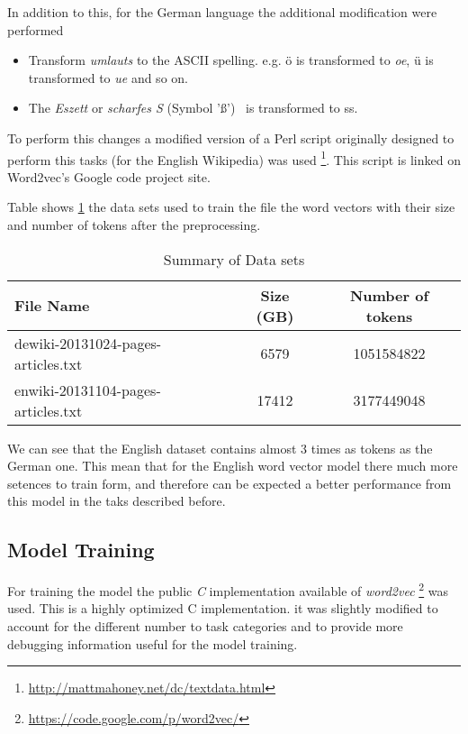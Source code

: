 In addition to this, for the German language the additional modification were
performed
\begin{itemize}
\item Transform \textit{umlauts} to the ASCII spelling.  e.g. \"{o} is
  transformed to \textit{oe},  \"{u} is transformed to \textit{ue}  and so
  on. 
\item The \textit{Eszett} or \textit{scharfes S} (Symbol '\ss') \  is transformed to ss.
\end{itemize}


To perform this changes a modified version of a Perl script originally
designed to perform this tasks (for the English Wikipedia) was used
\footnote{\url{http://mattmahoney.net/dc/textdata.html}}. This script is
linked on Word2vec's Google code project site.

Table shows \ref{tab:summ_dataset_germanword2vec} the data sets used
to train the file the word vectors with their size and number of tokens after
the preprocessing. 
  

 \begin{table}[h]
   \centering
   \caption{Summary of Data sets} 
   \label{tab:summ_dataset_germanword2vec}

   \begin{tabular}{ |l|c|c| }
   \hline           
    File Name &  Size (GB) & Number of tokens \\  \hline           
    dewiki-20131024-pages-articles.txt & 6579 &   1051584822 \\
    enwiki-20131104-pages-articles.txt & 17412 &  3177449048  \\
    \hline

\end{tabular}
\end{table}



We can see that the English dataset contains almost 3 times as tokens as the
German one. This mean that for the English word vector model  there much more
setences to train form, and therefore can be expected a better performance
from this model in the taks described before. 
  
\subsection{Model Training}
\label{experiments:sub:Training}

For training  the model the public \emph{C} implementation available of
\textit{word2vec} \footnote{\url{https://code.google.com/p/word2vec/}} was
used.  This is a highly optimized C implementation. it was slightly modified to account for the different
number to task categories and to provide more debugging information useful
for the model training. 

